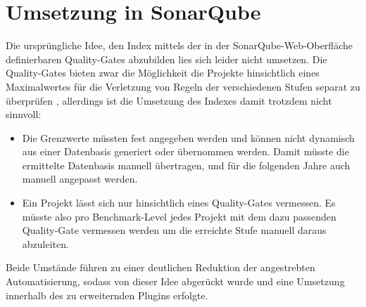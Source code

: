 \documentclass[da,ngerman]{stthesis}
\begin{document}
		\section{Umsetzung in SonarQube}
			Die ursprüngliche Idee, den Index mittels der in der SonarQube-Web-Oberfläche definierbaren Quality-Gates abzubilden lies sich leider nicht umsetzen. Die Quality-Gates bieten zwar die Möglichkeit die Projekte hinsichtlich eines Maximalwertes für die Verletzung von Regeln der verschiedenen Stufen separat zu überprüfen \cite{QualityGates}, allerdings ist die Umsetzung des Indexes damit trotzdem nicht sinnvoll:
			\begin{itemize}
				\item Die Grenzwerte müssten fest angegeben werden und können nicht dynamisch aus einer Datenbasis generiert oder übernommen werden. Damit müsste die ermittelte Datenbasis manuell übertragen, und für die folgenden Jahre auch manuell angepasst werden.
				\item Ein Projekt lässt sich nur hinsichtlich eines Quality-Gates vermessen. Es müsste also pro Benchmark-Level jedes Projekt mit dem dazu passenden Quality-Gate vermessen werden um die erreichte Stufe manuell daraus abzuleiten.
			\end{itemize}
			Beide Umstände führen zu einer deutlichen Reduktion der angestrebten Automatisierung, sodass von dieser Idee abgerückt wurde und eine Umsetzung innerhalb des zu erweiternden Plugins erfolgte.
			
  	\backmatter
  
  	\appendix
  	
  
\end{document}
